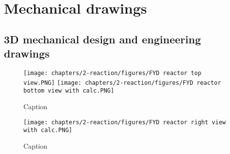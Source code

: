 \section{Mechanical drawings}
\label{app:reactor-drawings}
\subsection{3D mechanical design and engineering drawings}
\label{app:engineeringdesign}

\begin{figure}[H]
    \centering

    \texttt{[image: chapters/2-reaction/figures/FYD reactor top view.PNG]}
    \texttt{[image: chapters/2-reaction/figures/FYD reactor bottom view with calc.PNG]}
    \caption{Caption}
    \label{fig:reactorbottom}
\end{figure}

\begin{figure}
    \centering
    \texttt{[image: chapters/2-reaction/figures/FYD reactor right view with calc.PNG]}
    \caption{Caption}
    \label{fig:reactorright}
\end{figure}
